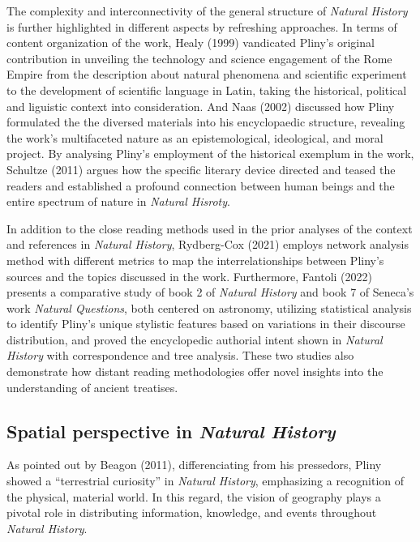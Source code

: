 \documentclass[
  12pt,
]{article}
\begin{document}
The complexity and interconnectivity of the general structure of
\emph{Natural History} is further highlighted in different aspects by
refreshing approaches. In terms of content organization of the work,
Healy (1999) vandicated Pliny's original contribution in unveiling the
technology and science engagement of the Rome Empire from the
description about natural phenomena and scientific experiment to the
development of scientific language in Latin, taking the historical,
political and liguistic context into consideration. And Naas (2002)
discussed how Pliny formulated the the diversed materials into his
encyclopaedic structure, revealing the work's multifaceted nature as an
epistemological, ideological, and moral project. By analysing Pliny's
employment of the historical exemplum in the work, Schultze (2011)
argues how the specific literary device directed and teased the readers
and established a profound connection between human beings and the
entire spectrum of nature in \emph{Natural Hisroty}.

In addition to the close reading methods used in the prior analyses of
the context and references in \emph{Natural History}, Rydberg-Cox (2021)
employs network analysis method with different metrics to map the
interrelationships between Pliny's sources and the topics discussed in
the work. Furthermore, Fantoli (2022) presents a comparative study of
book 2 of \emph{Natural History} and book 7 of Seneca's work
\emph{Natural Questions}, both centered on astronomy, utilizing
statistical analysis to identify Pliny's unique stylistic features based
on variations in their discourse distribution, and proved the
encyclopedic authorial intent shown in \emph{Natural History} with
correspondence and tree analysis. These two studies also demonstrate how
distant reading methodologies offer novel insights into the
understanding of ancient treatises.

\hypertarget{spatial-perspective-in-natural-history}{%
\subsection{\texorpdfstring{Spatial perspective in \emph{Natural
History}}{Spatial perspective in Natural History}}\label{spatial-perspective-in-natural-history}}

As pointed out by Beagon (2011), differenciating from his pressedors,
Pliny showed a ``terrestrial curiosity'' in \emph{Natural History},
emphasizing a recognition of the physical, material world. In this
regard, the vision of geography plays a pivotal role in distributing
information, knowledge, and events throughout \emph{Natural History}.
\end{document}
